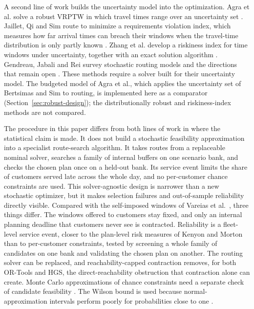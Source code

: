 \documentclass[11pt,a4paper]{article}
\begin{document}
A second line of work builds the uncertainty model into the optimization. Agra
et al. solve a robust VRPTW in which travel times range over an uncertainty set
\cite{agra2013}. Jaillet, Qi and Sim route to minimize a requirements violation
index, which measures how far arrival times can breach their windows when the
travel-time distribution is only partly known \cite{jaillet2016}. Zhang et al.
develop a riskiness index for time windows under uncertainty, together with an
exact solution algorithm \cite{zhang2019}. Gendreau, Jabali and Rei survey
stochastic routing models and the directions that remain open
\cite{gendreau1996,gendreau2016}. These methods require a solver built for their uncertainty
model. The budgeted model of Agra et al., which applies the uncertainty set of
Bertsimas and Sim \cite{bertsimas2004} to routing, is implemented here as a
comparator (Section~\ref{sec:robust-design}); the distributionally robust and
riskiness-index methods \cite{jaillet2016,zhang2019} are not compared.

The procedure in this paper differs from both lines of work in where the
statistical claim is made. It does not build a stochastic feasibility
approximation into a specialist route-search algorithm. It takes routes from a
replaceable nominal solver, searches a family of internal buffers on one scenario
bank, and checks the chosen plan once on a held-out bank. Its service event
limits the share of customers served late across the whole day, and no
per-customer chance constraints are used. This solver-agnostic design is narrower
than a new stochastic optimizer, but it makes selection failures and
out-of-sample reliability directly visible. Compared with the self-imposed windows
of Vareias et al.\ \cite{vareias2019}, three things differ. The windows offered to customers stay
fixed, and only an internal planning deadline that customers never see is
contracted. Reliability is a fleet-level service event, closer to the plan-level
risk measures of Kenyon and Morton \cite{kenyon2003} than to per-customer
constraints, tested by screening a
whole family of candidates on one bank and validating the chosen plan on
another. The routing solver can be replaced, and reachability-capped
contraction removes, for both OR-Tools and HGS, the direct-reachability
obstruction that contraction alone can create.
Monte Carlo approximations of chance constraints
need a separate check of candidate feasibility \cite{ahmed2008}. The Wilson bound
is used because normal-approximation intervals perform poorly for probabilities
close to one \cite{wilson1927,brown2001}.
\end{document}

